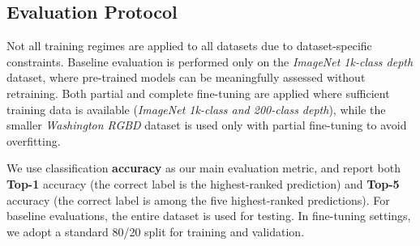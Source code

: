 \subsection{Evaluation Protocol}

Not all training regimes are applied to all datasets due to dataset-specific constraints. Baseline evaluation is performed only on the \textit{ImageNet 1k-class depth} dataset, where pre-trained models can be meaningfully assessed without retraining. Both partial and complete fine-tuning are applied where sufficient training data is available (\textit{ImageNet 1k-class and 200-class depth}), while the smaller \textit{Washington RGBD} dataset is used only with partial fine-tuning to avoid overfitting.

We use classification \textbf{accuracy} as our main evaluation metric, and report both \textbf{Top-1} accuracy (the correct label is the highest-ranked prediction) and \textbf{Top-5} accuracy (the correct label is among the five highest-ranked predictions). For baseline evaluations, the entire dataset is used for testing. In fine-tuning settings, we adopt a standard 80/20 split for training and validation.